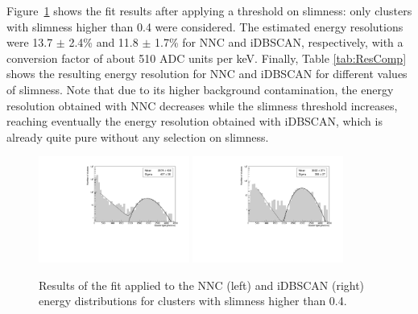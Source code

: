\documentclass[a4paper,11pt]{article}
\begin{document}
Figure~\ref{fig_CosFe_slim} shows the fit results after applying a threshold on slimness: only clusters with slimness higher than 0.4 were considered.
The estimated energy resolutions were 13.7 $\pm$ 2.4\% and 11.8 $\pm$ 1.7\% for NNC and iDBSCAN, respectively, with a conversion factor of about 510 ADC units per keV.
Finally, Table \ref{tab:ResComp} shows the resulting energy resolution for NNC and iDBSCAN for different values of slimness. Note that due to its higher background contamination, the energy resolution obtained with NNC decreases while the slimness threshold increases, reaching eventually the energy resolution obtained with iDBSCAN, which is already quite pure without any selection on slimness.


\begin{figure}[ht]
\centering
\includegraphics[width=0.44\textwidth]{log_Resolution_NNC_4.pdf}
\includegraphics[width=0.44\textwidth]{log_Resolution_DB_4.pdf}
\caption{Results of the fit applied to the NNC (left) and iDBSCAN (right) energy distributions for clusters with slimness higher than 0.4.} 
\label{fig_CosFe_slim}
\end{figure}
\end{document}
